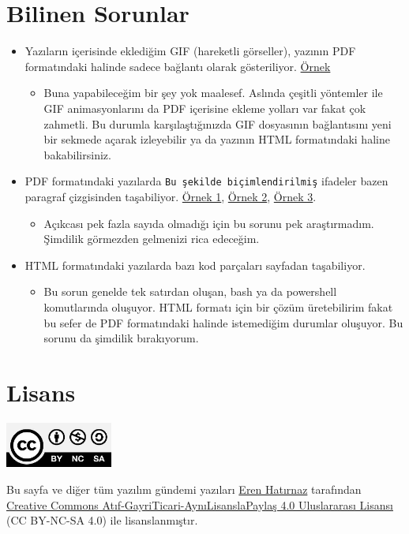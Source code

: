 \documentclass[11pt]{article}
\begin{document}
\section*{Bilinen Sorunlar}
\label{sec:org68c4b67}
\begin{itemize}
\item Yazıların içerisinde eklediğim GIF (hareketli görseller), yazının PDF
formatındaki halinde sadece bağlantı olarak gösteriliyor. \href{img/pdf-gif-link-sorun.png}{Örnek}
\begin{itemize}
\item Buna yapabileceğim bir şey yok maalesef. Aslında çeşitli yöntemler ile GIF
animasyonlarını da PDF içerisine ekleme yolları var fakat çok zahmetli. Bu
durumla karşılaştığınızda GIF dosyasının bağlantısını yeni bir sekmede
açarak izleyebilir ya da yazının HTML formatındaki haline bakabilirsiniz.
\end{itemize}
\item PDF formatındaki yazılarda \texttt{Bu şekilde biçimlendirilmiş} ifadeler bazen
paragraf çizgisinden taşabiliyor. \href{img/paragraf-tasma-sorunu-1.png}{Örnek 1}, \href{img/paragraf-tasma-sorunu-2.png}{Örnek 2}, \href{img/paragraf-tasma-sorunu-3.png}{Örnek 3}.
\begin{itemize}
\item Açıkcası pek fazla sayıda olmadığı için bu sorunu pek araştırmadım.
Şimdilik görmezden gelmenizi rica edeceğim.
\end{itemize}
\item HTML formatındaki yazılarda bazı kod parçaları sayfadan taşabiliyor.
\begin{itemize}
\item Bu sorun genelde tek satırdan oluşan, bash ya da powershell komutlarında
oluşuyor. HTML formatı için bir çözüm üretebilirim fakat bu sefer de PDF
formatındaki halinde istemediğim durumlar oluşuyor. Bu sorunu da şimdilik
bırakıyorum.
\end{itemize}
\end{itemize}
\section*{Lisans}
\label{sec:orgeb11790}
\begin{center}
\begin{center}
\includegraphics[height=1.5cm]{img/CC_BY-NC-SA_4.0.png}
\end{center}

Bu sayfa ve diğer tüm yazılım gündemi yazıları \href{https://erenhatirnaz.github.io}{Eren Hatırnaz} tarafından
\href{http://creativecommons.org/licenses/by-nc-sa/4.0/}{Creative Commons Atıf-GayriTicari-AynıLisanslaPaylaş 4.0 Uluslararası Lisansı}
(CC BY-NC-SA 4.0) ile lisanslanmıştır.
\end{center}
\end{document}
